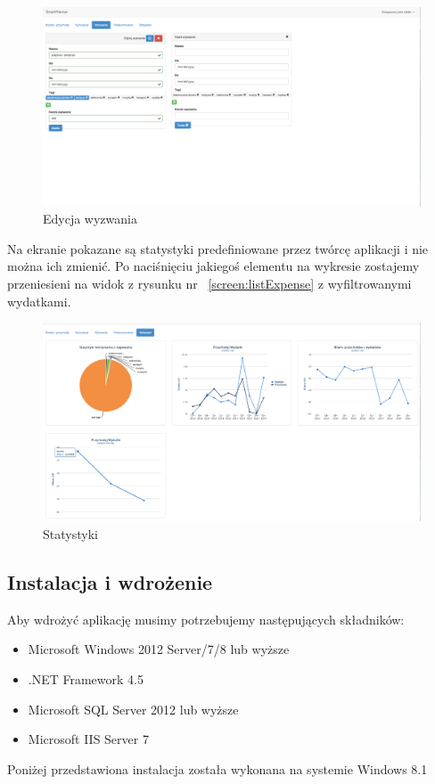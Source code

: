 \documentclass[10pt,titlepage]{article}
\begin{document}
\begin{figure}[H]
  \centering
  \includegraphics[scale=0.2]{images/screen_wyzwaniaEdycja.png}
  \caption{Edycja wyzwania}
\end{figure}
Na ekranie pokazane są statystyki predefiniowane przez twórcę aplikacji i nie można ich zmienić. Po naciśnięciu jakiegoś elementu na wykresie zostajemy przeniesieni na widok z rysunku nr ~\ref{screen:listExpense} z wyfiltrowanymi wydatkami.
\begin{figure}[H]
  \centering
  \includegraphics[scale=0.2]{images/screen_statystyki.png}
  \caption{Statystyki}
\end{figure}
\subsection{Instalacja i wdrożenie}
Aby wdrożyć aplikację musimy potrzebujemy następujących składników:
\begin{itemize}
  \item Microsoft Windows 2012 Server/7/8 lub wyższe
  \item .NET Framework 4.5
  \item Microsoft SQL Server 2012 lub wyższe
  \item Microsoft IIS Server 7
\end{itemize}
Poniżej przedstawiona instalacja została wykonana na systemie Windows 8.1
\end{document}
